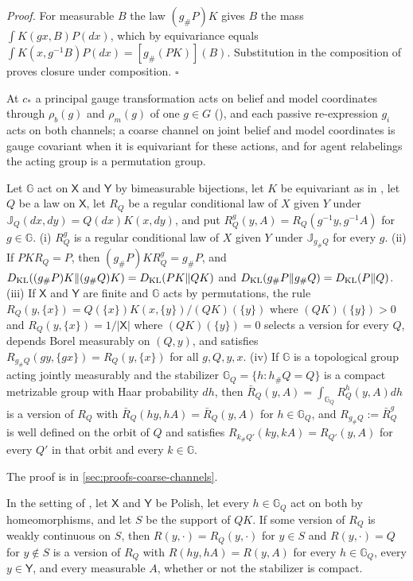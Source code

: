 \noindent\emph{Proof.}
For measurable $B$ the law $(g_\#P)K$ gives $B$ the mass $\int K(gx,B)P(dx)$, which by
equivariance equals $\int K(x,g^{-1}B)P(dx)=[g_\#(PK)](B)$. Substitution in the composition of
 proves closure under composition. $\square$

At $c_*$ a principal gauge transformation acts on belief and model coordinates through $\rho_b(g)$
and $\rho_m(g)$ of one $g\in G$ (), and each passive
re-expression $g_i$ acts on both channels; a coarse channel on joint belief and model coordinates is
gauge covariant when it is equivariant for these actions, and for agent relabelings the acting group
is a permutation group.

\label{eq:cg-bayes-version-transport}
\label{eq:cg-finite-equivariant-bayes}
\label{eq:cg-haar-averaged-bayes}
Let $\mathbb G$ act on $\mathsf X$ and $\mathsf Y$ by bimeasurable bijections, let $K$ be
equivariant as in , let $Q$ be a law on $\mathsf X$, let $R_Q$ be a regular
conditional law of $X$ given $Y$ under $\mathbb J_Q(dx,dy)=Q(dx)K(x,dy)$, and put
$R_Q^g(y,A)=R_Q(g^{-1}y,g^{-1}A)$ for $g\in\mathbb G$. (i) $R_Q^g$ is a regular conditional law of
$X$ given $Y$ under $\mathbb J_{g_\#Q}$ for every $g$. (ii) If $PKR_Q=P$, then
$(g_\#P)KR_Q^g=g_\#P$, and $D_{\mathrm{KL}}((g_\#P)K\Vert(g_\#Q)K)=D_{\mathrm{KL}}(PK\Vert QK)$ and
$D_{\mathrm{KL}}(g_\#P\Vert g_\#Q)=D_{\mathrm{KL}}(P\Vert Q)$. (iii) If $\mathsf X$ and $\mathsf Y$ are finite and
$\mathbb G$ acts by permutations, the rule $R_Q(y,\{x\})=Q(\{x\})K(x,\{y\})/(QK)(\{y\})$ where
$(QK)(\{y\})>0$ and $R_Q(y,\{x\})=1/\lvert\mathsf X\rvert$ where $(QK)(\{y\})=0$ selects a version
for every $Q$, depends Borel measurably on $(Q,y)$, and satisfies
$R_{g_\#Q}(gy,\{gx\})=R_Q(y,\{x\})$ for all $g,Q,y,x$. (iv) If $\mathbb G$ is a topological group
acting jointly measurably and the stabilizer $\mathbb G_Q=\{h:h_\#Q=Q\}$ is a compact metrizable
group with Haar probability $dh$, then $\bar R_Q(y,A)=\int_{\mathbb G_Q}R_Q^h(y,A)dh$ is a version
of $R_Q$ with $\bar R_Q(hy,hA)=\bar R_Q(y,A)$ for $h\in\mathbb G_Q$, and $R_{g_\#Q}:=\bar R_Q^g$ is
well defined on the orbit of $Q$ and satisfies $R_{k_\#Q'}(ky,kA)=R_{Q'}(y,A)$ for every $Q'$ in
that orbit and every $k\in\mathbb G$. 

The proof is in \cref{sec:proofs-coarse-channels}.

In the setting of , let $\mathsf X$ and $\mathsf Y$ be Polish,
let every $h\in\mathbb G_Q$ act on both by homeomorphisms, and let $S$ be the support of $QK$. If some
version of $R_Q$ is weakly continuous on $S$, then $R(y,\cdot)=R_Q(y,\cdot)$ for $y\in S$ and
$R(y,\cdot)=Q$ for $y\notin S$ is a version of $R_Q$ with $R(hy,hA)=R(y,A)$ for every
$h\in\mathbb G_Q$, every $y\in\mathsf Y$, and every measurable $A$, whether or not the stabilizer is
compact. 

